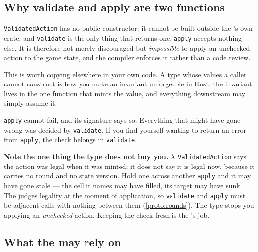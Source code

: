 \documentclass{article}
\begin{document}
\subsection{Why validate and apply are two functions}

\texttt{ValidatedAction} has no public constructor: it cannot be built outside the \chart's own
crate, and \texttt{validate} is the only thing that returns one. \texttt{apply} accepts nothing
else. It is therefore not merely discouraged but \emph{impossible} to apply an unchecked action to
the game state, and the compiler enforces it rather than a code review.

This is worth copying elsewhere in your own code. A type whose values a caller cannot construct is
how you make an invariant unforgeable in Rust: the invariant lives in the one function that mints
the value, and everything downstream may simply assume it.

\texttt{apply} cannot fail, and its signature says so. Everything that might have gone wrong was
decided by \texttt{validate}. If you find yourself wanting to return an error from \texttt{apply},
the check belongs in \texttt{validate}.

\textbf{Note the one thing the type does not buy you.} A \texttt{ValidatedAction} says the action
was legal when it was minted; it does not say it is legal now, because it carries no round and no
state version. Hold one across another \texttt{apply} and it may have gone stale --- the cell it
names may have filled, its target may have sunk. The \MD{} judges legality at the moment of
application, so \texttt{validate} and \texttt{apply} must be adjacent calls with nothing between
them (\cref{proto:rounds}). The type stops you applying an \emph{unchecked} action. Keeping the
check fresh is the \admiralty's job.

\subsection{What the \admiralty{} may rely on}
\end{document}
